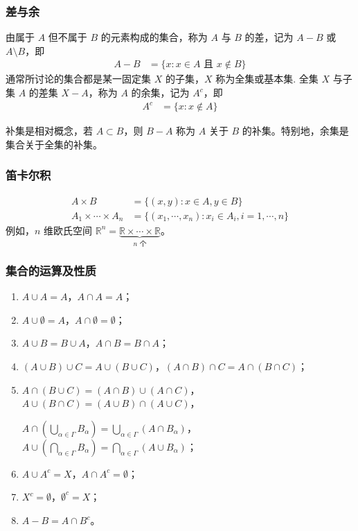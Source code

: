 \documentclass[../../main.tex]{subfiles}
\begin{document}
\subsubsection*{差与余}
由属于 \(A\) 但不属于 \(B\) 的元素构成的集合，称为 \(A\) 与 \(B\) 的差，记为 \(A - B\) 或 \(A \setminus B\)，即
\begin{align*}
A - B &= \{x : x \in A \text{ 且 } x \notin B\}
\end{align*}
通常所讨论的集合都是某一固定集 \(X\) 的子集，\(X\) 称为全集或基本集. 全集 \(X\) 与子集 \(A\) 的差集 \(X - A\)，称为 \(A\) 的余集，记为 \(A^c\)，即
\begin{align*}
A^c &= \{x : x \notin A\}
\end{align*}
\begin{remark}
补集是相对概念，若 \(A \subset B\)，则 \(B - A\) 称为 \(A\) 关于 \(B\) 的补集。特别地，余集是集合关于全集的补集。
\end{remark}

\subsubsection*{笛卡尔积}
\begin{align*}
A \times B &= \{(x, y) : x \in A, y \in B\}\\
A_1 \times \cdots \times A_n &= \{(x_1, \cdots, x_n) : x_i \in A_i, i = 1, \cdots, n\}
\end{align*}
例如，\(n\) 维欧氏空间 \(\mathbb{R}^n = \underbrace{\mathbb{R} \times \cdots \times \mathbb{R}}_{n \text{ 个}}\)。

\subsubsection*{集合的运算及性质}
\begin{enumerate}[(1)]
\item \(A \cup A = A\)，\(A \cap A = A\)；

\item \(A \cup \emptyset = A\)，\(A \cap \emptyset = \emptyset\)；

\item \(A \cup B = B \cup A\)，\(A \cap B = B \cap A\)；

\item \((A \cup B) \cup C = A \cup (B \cup C)\)，\((A \cap B) \cap C = A \cap (B \cap C)\)；

\item \(A \cap (B \cup C) = (A \cap B) \cup (A \cap C)\)，\(A \cup (B \cap C) = (A \cup B) \cap (A \cup C)\)，

\(A \cap (\bigcup_{\alpha \in \varGamma} B_{\alpha}) = \bigcup_{\alpha \in \varGamma}(A \cap B_{\alpha})\)，\(A \cup (\bigcap_{\alpha \in \varGamma} B_{\alpha}) = \bigcap_{\alpha \in \varGamma}(A \cup B_{\alpha})\)；

\item \(A \cup A^c = X\)，\(A \cap A^c = \emptyset\)；

\item \(X^c = \emptyset\)，\(\emptyset^c = X\)；

\item \(A - B = A \cap B^c\)。
\end{enumerate}
\end{document}
